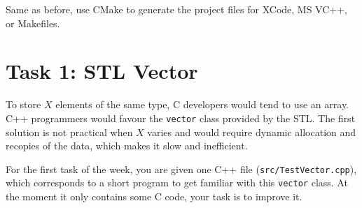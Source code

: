 Same as before, use CMake to generate the project files for XCode, MS VC++, or Makefiles. 

\section*{Task 1: STL Vector}

To store $X$ elements of the same type,
C developers would tend to use an array. C++ programmers would favour the \verb+vector+ class provided by the STL. 
The first solution is not practical when $X$ varies and would require dynamic allocation and recopies of the data, which makes it slow and inefficient. 

For the first task of the week, you are given one C++ file (\verb+src/TestVector.cpp+), which corresponds to a short program to get familiar with this \verb+vector+ class. At the moment it only contains some C code, your task is to improve it. 

